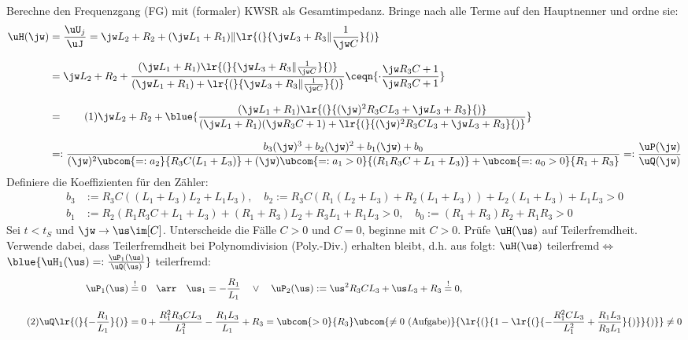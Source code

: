\documentclass[ngerman,10pt,a4paper]{article}%
\begin{document}
%
\thispagestyle{empty}%

%

\allowdisplaybreaks
\reversemarginpar
\newcommand{\numberthis}[1]{%
	\stepcounter{equation}\tag{\theequation}\label{#1}%
}%

%
%
%
\noindent Berechne den Frequenzgang (FG) mit (formaler) KWSR als Gesamtimpedanz. Bringe nach  alle Terme auf den Hauptnenner und ordne sie:
\begin{align*}%
	\uH(\jw)&=\frac{\uU_j}{\uJ}=\jw L_2+R_2+(\jw L_1+R_1)\|\lr{(}{%
		\jw L_3+R_3\|\frac{1}{\jw C}%
	}{)}\\[2.5mm]%
%
	&=\jw L_2+R_2+\frac{%
		(\jw L_1+R_1)\lr{(}{%
			\jw L_3+R_3\|\frac{1}{\jw C}%
		}{)}
	}{%
		(\jw L_1+R_1)+\lr{(}{%
			\jw L_3+R_3\|\frac{1}{\jw C}%
		}{)}%
	}\ceqn{%
		\cdot\frac{\jw R_3C+1}{\jw R_3C+1}%
	}\\[2.5mm]%
%
	&=\numberthis{a1a_FG_Poly1}\jw L_2+R_2+\blue{\frac{%
		(\jw L_1+R_1)\lr{(}{%
			(\jw)^2R_3CL_3+\jw L_3+R_3%
		}{)}%
	}{%
		(\jw L_1+R_1)(\jw R_3C+1)+\lr{(}{%
			(\jw)^2R_3CL_3+\jw L_3+R_3%
		}{)}%
	}}\\[2.5mm]%
%
	&=:\frac{%
		b_3(\jw)^3+b_2(\jw)^2+b_1(\jw)+b_0%
	}{%
		(\jw)^2\ubcom{=:a_2}{R_3C(L_1+L_3)}+(\jw)\ubcom{=:a_1>0}{(R_1R_3C+L_1+L_3)}+\ubcom{=:a_0>0}{R_1+R_3}%
	}=:\frac{\uP(\jw)}{\uQ(\jw)}%
\end{align*}
%
Definiere die Koeffizienten für den Zähler:
\begin{align*}
	b_3&:=R_3C((L_1+L_3)L_2+L_1L_3),\quad b_2:=R_3C(R_1(L_2+L_3)+R_2(L_1+L_3))+L_2(L_1+L_3)+L_1L_3>0\\[2.5mm]%
%
	b_1&:=R_2(R_1R_3C+L_1+L_3)+(R_1+R_3)L_2+R_3L_1+R_1L_3>0,\quad b_0:=(R_1+R_3)R_2+R_1R_3>0%
\end{align*}%
%
%
%
Sei $t<t_S$ und $\jw\rightarrow\us\im[C]$. Unterscheide die Fälle $C>0$ und $C=0$, beginne mit $C>0$. Prüfe $\uH(\us)$ auf Teilerfremdheit. Verwende dabei, dass Teilerfremdheit bei Polynomdivision (Poly.-Div.) erhalten bleibt, d.h. aus  folgt: \glqq$\uH(\us)$ teilerfremd\grqq $\Leftrightarrow$ \glqq$\blue{%
	\uH_1(\us)=:\frac{\uP_1(\us)}{\uQ(\us)}%
}$ teilerfremd\grqq:
%
\begin{align*}%
	\uP_1(\us)&\overset{!}{=}0\quad\arr\quad\us_1=-\frac{R_1}{L_1}\quad\vee\quad\uP_2(\us):=\us^2R_3CL_3+\us L_3+R_3\overset{!}{=}0,\\[2.5mm]%
%
	\numberthis{a1b_FG_Poly2}\uQ\lr{(}{%
		-\frac{R_1}{L_1}%
	}{)}&=0+\frac{R_1^2R_3CL_3}{L_1^2}-\frac{R_1L_3}{L_1}+R_3=\ubcom{>0}{R_3}\ubcom{\neq0\text{ (Aufgabe)}}{%
		\lr{(}{%
			1-\lr{(}{%
				-\frac{R_1^2CL_3}{L_1^2}+\frac{R_1L_3}{R_3L_1}%
			}{)}%
		}{)}%
	}\neq0%
\end{align*}%
\end{document}
